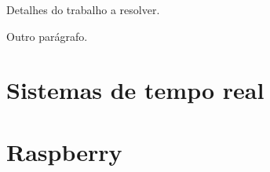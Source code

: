 
Detalhes do trabalho a resolver.

Outro parágrafo.

\section{Sistemas de tempo real}
\section{Raspberry}
